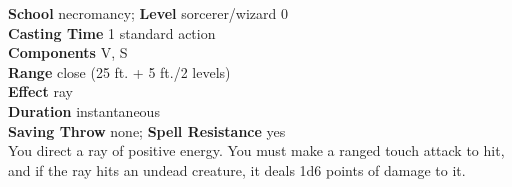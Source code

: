 \textbf{School} necromancy; \textbf{Level} sorcerer/wizard 0\\
\textbf{Casting Time} 1 standard action\\
\textbf{Components} V, S\\
\textbf{Range} close (25 ft. + 5 ft./2 levels)\\
\textbf{Effect} ray\\
\textbf{Duration} instantaneous\\
\textbf{Saving Throw} none; \textbf{Spell Resistance} yes\\
You direct a ray of positive energy. You must make a ranged touch attack to hit, and if the ray hits an undead creature, it deals 1d6 points of damage to it.\\

